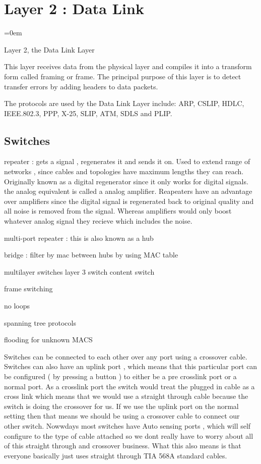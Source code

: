 
\section{Layer 2 : Data Link}
\label{sec:layer_2_data_link}
\parindent=0em

Layer 2, the Data Link Layer

This layer receives data from the physical layer and compiles it into a transform form called framing or frame. The principal purpose of this layer is to detect transfer errors by adding headers to data packets.

The protocols are used by the Data Link Layer include: ARP, CSLIP, HDLC, IEEE.802.3, PPP, X-25, SLIP, ATM, SDLS and PLIP.

\subsection{Switches}
\label{ssec:switches}



repeater : gets a signal , regenerates it and sends it on. Used to extend
range of networks , since cables and topologies have maximum lengths they can
reach. Originally known as a digital regenerator since it only works for digital signals.
the analog equivalent is called a analog amplifier. Reapeaters have an advantage
over amplifiers since the digital signal is regenerated back to original quality
and all noise is removed from the signal. Whereas amplifiers would only boost
whatever analog signal they recieve which includes the noise.

multi-port repeater : this is also known as a hub





bridge : filter by mac between hubs by using MAC table

multilayer switches
layer 3 switch
content switch

frame switching

no loops

spanning tree protocols

flooding for unknown MACS


Switches can be connected to each other over any port using a crossover cable.
Switches can also have an uplink port , which means that this particular port
can be configured ( by pressing a button ) to either be a pre crosslink port or
a normal port. As a crosslink port the switch would treat the plugged in cable
as a cross link which means that we would use a straight through cable because
the switch is doing the crossover for us. If we use the uplink port on the
normal setting then that means we should be using a crossover cable to connect
our other switch. Nowwdays most switches have Auto sensing ports , which will
self configure to the type of cable attached so we dont really have to worry
about all of this straight through and crossover business. What this also
means is that everyone basically just uses straight through TIA 568A standard
cables.

